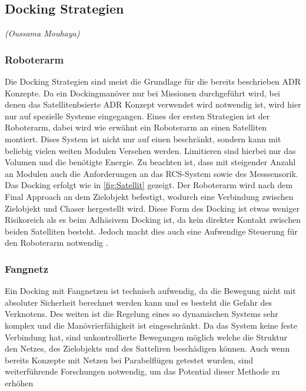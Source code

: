 		\subsection{Docking Strategien}
			\hfill\emph{(Oussama Mouhaya)}

\subsubsection{Roboterarm}
Die Docking Strategien sind meist die Grundlage für die bereits beschrieben ADR Konzepte.	Da ein Dockingmanöver nur bei  Missionen durchgeführt wird, bei denen das Satellitenbsierte ADR Konzept verwendet wird notwendig ist, wird hier nur auf spezielle Systeme eingegangen. Eines der ersten Strategien ist der Roboterarm, dabei wird wie erwähnt ein Roboterarm an einen Satelliten montiert. Dises System ist nicht nur auf einen beschränkt, sondern kann mit beliebig vielen weiten Modulen Versehen werden. Limitieren sind hierbei nur das Volumen und die benötigte Energie. Zu beachten ist, dass mit steigender Anzahl an Modulen auch die Anforderungen an das RCS-System sowie des Messsensorik. Das Docking erfolgt wie in \ref{fig:Satellit} gezeigt. Der Roboterarm wird nach dem Final Approach an dem Zielobjekt befestigt, wodurch eine Verbindung zwischen Zielobjekt und Chaser hergestellt wird. Diese Form des Docking ist etwas weniger Risikoreich als es beim Adhäsivem Docking ist, da kein direkter Kontakt zwischen beiden Satelliten besteht. Jedoch macht dies auch eine Aufwendige Steuerung für den Roboterarm notwendig \cite{Castronuovo.2011}.

\subsubsection{Fangnetz}

	Ein Docking mit Fangnetzen ist technisch aufwendig, da die Bewegung nicht mit absoluter Sicherheit berechnet werden kann und es besteht die Gefahr des Verknotens. Des weiten ist die Regelung eines so dynamischen Systems sehr komplex und die Manövrierfähigkeit ist eingeschränkt. Da das System keine feste Verbindung hat, sind unkontrollierte Bewegungen möglich welche die Struktur den Netzes, des Zielobjekts und des Satteliren beschädigen können. Auch wenn bereits Konzepte mit Netzen bei Parabelflügen getestet wurden, sind weiterführende  Forschungen notwendig, um das Potential dieser Methode zu erhöhen


